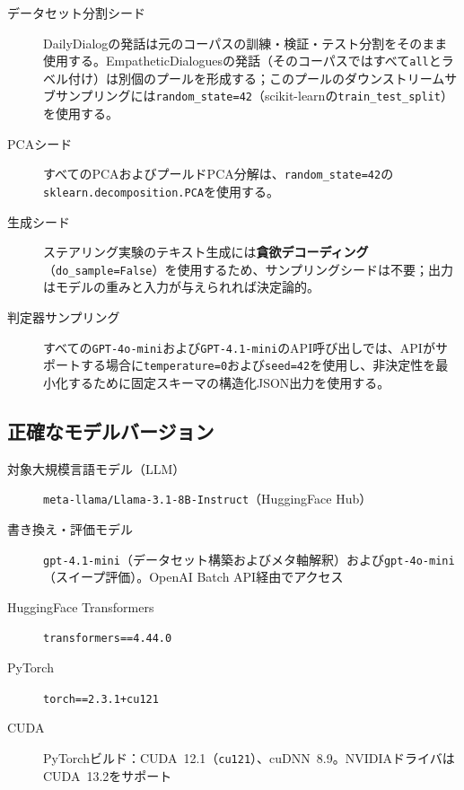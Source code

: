\begin{description}
  \item[データセット分割シード] DailyDialogの発話は元のコーパスの訓練・検証・テスト分割をそのまま使用する。EmpatheticDialoguesの発話（そのコーパスではすべて\texttt{all}とラベル付け）は別個のプールを形成する；このプールのダウンストリームサブサンプリングには\texttt{random\_state=42}（scikit-learnの\texttt{train\_test\_split}）を使用する。

  \item[PCAシード] すべてのPCAおよびプールドPCA分解は、\texttt{random\_state=42}の\texttt{sklearn.decomposition.PCA}を使用する。

  \item[生成シード] ステアリング実験のテキスト生成には\textbf{貪欲デコーディング}（\texttt{do\_sample=False}）を使用するため、サンプリングシードは不要；出力はモデルの重みと入力が与えられれば決定論的。

  \item[判定器サンプリング] すべての\texttt{GPT-4o-mini}および\texttt{GPT-4.1-mini}のAPI呼び出しでは、APIがサポートする場合に\texttt{temperature=0}および\texttt{seed=42}を使用し、非決定性を最小化するために固定スキーマの構造化JSON出力を使用する。
\end{description}

\subsection*{正確なモデルバージョン}

\begin{description}
  \item[対象大規模言語モデル（LLM）] \texttt{meta-llama/Llama-3.1-8B-Instruct}（HuggingFace Hub）

  \item[書き換え・評価モデル] \texttt{gpt-4.1-mini}（データセット構築およびメタ軸解釈）および\texttt{gpt-4o-mini}（スイープ評価）。OpenAI Batch API経由でアクセス

  \item[HuggingFace Transformers] \texttt{transformers==4.44.0}

  \item[PyTorch] \texttt{torch==2.3.1+cu121}

  \item[CUDA] PyTorchビルド：CUDA~12.1（\texttt{cu121}）、cuDNN~8.9。NVIDIAドライバはCUDA~13.2をサポート
\end{description}

